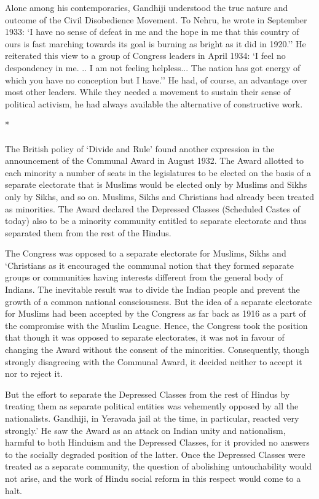 Alone among his contemporaries, Gandhiji understood the true nature and outcome of the Civil Disobedience Movement. To Nehru, he wrote in September 1933: `I have no sense of defeat in me and the hope in me that this country of ours is fast marching towards its goal is burning as bright as it did in 1920.'' He reiterated this view to a group of Congress leaders in April 1934: `I feel no despondency in me. .. I am not feeling helpless... The nation has got energy of which you have no conception but I have.'' He had, of course, an advantage over most other leaders. While they needed a movement to sustain their sense of political activism, he had always available the alternative of constructive work.

\begin{center}*\end{center}

\paragraph*{}


The British policy of `Divide and Rule' found another expression in the announcement of the Communal Award in August 1932. The Award allotted to each minority a number of seats in the legislatures to be elected on the basis of a separate electorate that is Muslims would be elected only by Muslims and Sikhs only by Sikhs, and so on. Muslims, Sikhs and Christians had already been treated as minorities. The Award declared the Depressed Classes (Scheduled Castes of today) also to be a minority community entitled to separate electorate and thus separated them from the rest of the Hindus. 

The Congress was opposed to a separate electorate for Muslims, Sikhs and `Christians as it encouraged the communal notion that they formed separate groups or communities having interests different from the general body of Indians. The inevitable result was to divide the Indian people and prevent the growth of a common national consciousness. But the idea of a separate electorate for Muslims had been accepted by the Congress as far back as 1916 as a part of the compromise with the Muslim League. Hence, the Congress took the position that though it was opposed to separate electorates, it was not in favour of changing the Award without the consent of the minorities. Consequently, though strongly disagreeing with the Communal Award, it decided neither to accept it nor to reject it. 

But the effort to separate the Depressed Classes from the rest of Hindus by treating them as separate political entities was vehemently opposed by all the nationalists. Gandhiji, in Yeravada jail at the time, in particular, reacted very strongly.' He saw the Award as an attack on Indian unity and nationalism, harmful to both Hinduism and the Depressed Classes, for it provided no answers to the socially degraded position of the latter. Once the Depressed Classes were treated as a separate community, the question of abolishing untouchability would not arise, and the work of Hindu social reform in this respect would come to a halt. 

